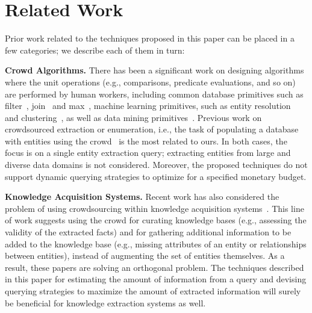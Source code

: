 

\section{Related Work}
\label{sec:related}
Prior work related to the techniques proposed in this paper can be placed in a few categories; we describe each of them in turn:

\vspace{3pt}\noindent\textbf{Crowd Algorithms.} There has been a significant work on designing algorithms where the unit operations (e.g., comparisons, predicate evaluations, and so on) are performed by human workers, including common database primitives such as filter~\cite{crowdscreen}, join~\cite{markus-sorts-joins} and max~\cite{so-who-won},  machine learning primitives, such as entity resolution~\cite{entity-matching, crowder} and clustering~\cite{crowdclustering}, as well as data mining primitives~\cite{amsterdamer:2013, get-another-label}. Previous work on crowdsourced extraction or enumeration, i.e., the task of populating a database with entities using the crowd~\cite{park:2014, trushkowsky:2013} is the most related to ours. In both cases, the focus is on a single entity extraction query; extracting entities from large and diverse data domains is not considered. Moreover, the proposed techniques do not support  dynamic querying strategies to optimize for a specified monetary budget. 


\vspace{3pt}\noindent\textbf{Knowledge Acquisition Systems.} Recent work has also considered the problem of using crowdsourcing within knowledge acquisition systems~\cite{jiang:13, kondredi:2014, west:2014}. This line of work suggests using the crowd for curating knowledge bases (e.g., assessing the validity of the extracted facts) and for gathering additional information to be added to the knowledge base (e.g., missing attributes of an entity or relationships between entities), instead of augmenting the set of entities themselves. As a result, these papers are solving an orthogonal problem. The techniques described in this paper for estimating the amount of information from a query and devising querying strategies to maximize the amount of extracted information will surely be beneficial for knowledge extraction systems as well.

